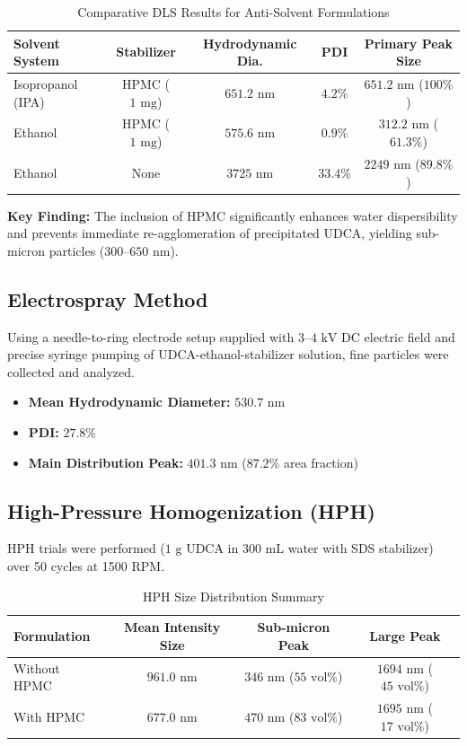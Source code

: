 \documentclass[11pt,a4paper]{article}
\begin{document}
\begin{table}[H]
\centering
\caption{Comparative DLS Results for Anti-Solvent Formulations}
\begin{tabular}{lcccc}
\toprule
\textbf{Solvent System} & \textbf{Stabilizer} & \textbf{Hydrodynamic Dia.} & \textbf{PDI} & \textbf{Primary Peak Size} \\
\midrule
Isopropanol (IPA) & HPMC ($1\text{ mg}$) & $651.2\text{ nm}$ & $4.2\%$ & $651.2\text{ nm}$ ($100\%$) \\
Ethanol & HPMC ($1\text{ mg}$) & $575.6\text{ nm}$ & $0.9\%$ & $312.2\text{ nm}$ ($61.3\%$) \\
Ethanol & None & $3725\text{ nm}$ & $33.4\%$ & $2249\text{ nm}$ ($89.8\%$) \\
\bottomrule
\end{tabular}
\end{table}

\textbf{Key Finding:} The inclusion of HPMC significantly enhances water dispersibility and prevents immediate re-agglomeration of precipitated UDCA, yielding sub-micron particles ($300$--$650\text{ nm}$).

\subsection{Electrospray Method}
Using a needle-to-ring electrode setup supplied with $3$--$4\text{ kV}$ DC electric field and precise syringe pumping of UDCA-ethanol-stabilizer solution, fine particles were collected and analyzed.
\begin{itemize}
    \item \textbf{Mean Hydrodynamic Diameter:} $530.7\text{ nm}$
    \item \textbf{PDI:} $27.8\%$
    \item \textbf{Main Distribution Peak:} $401.3\text{ nm}$ ($87.2\%$ area fraction)
\end{itemize}

\subsection{High-Pressure Homogenization (HPH)}
HPH trials were performed ($1\text{ g}$ UDCA in $300\text{ mL}$ water with SDS stabilizer) over 50 cycles at 1500 RPM.

\begin{table}[H]
\centering
\caption{HPH Size Distribution Summary}
\begin{tabular}{lccc}
\toprule
\textbf{Formulation} & \textbf{Mean Intensity Size} & \textbf{Sub-micron Peak} & \textbf{Large Peak} \\
\midrule
Without HPMC & $961.0\text{ nm}$ & $346\text{ nm}$ ($55\text{ vol}\%$) & $1694\text{ nm}$ ($45\text{ vol}\%$) \\
With HPMC & $677.0\text{ nm}$ & $470\text{ nm}$ ($83\text{ vol}\%$) & $1695\text{ nm}$ ($17\text{ vol}\%$) \\
\bottomrule
\end{tabular}
\end{table}
\end{document}
